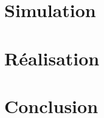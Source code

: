 \documentclass[a4paper, 11pt]{report}
\begin{document}
\section{Simulation}

\section{Réalisation}

\section*{Conclusion}


\end{document}
